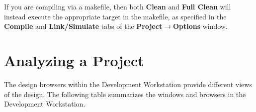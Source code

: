\documentclass{article}
\newcommand{\te}[1]{\texttt{#1}}
\begin{document}
If you are compiling via a  makefile,
then both {\bf Clean} and {\bf Full Clean}  will instead execute the
appropriate target in the makefile, as specified in the {\bf Compile}
and {\bf Link/Simulate} tabs of the {\bf Project$\rightarrow$Options} window.


\section {Analyzing a Project}

The design browsers within the Development
Workstation provide different views of the design.
The following table summarizes the
windows and browsers in the Development Workstation.


\end{document}
